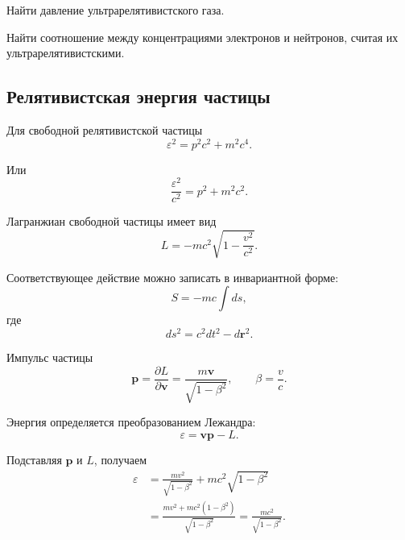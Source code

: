 \documentclass[../final.tex]{subfiles}
\begin{document}
Найти давление ультрарелятивистского газа.

Найти соотношение между концентрациями электронов и нейтронов,
считая их ультрарелятивистскими.



\subsection*{Релятивистская энергия частицы}

Для свободной релятивистской частицы
%
\begin{equation*}
    \varepsilon^2
    =
    p^2c^2
    +
    m^2c^4.
\end{equation*}

Или
%
\begin{equation*}
    \frac{\varepsilon^2}{c^2}
    =
    p^2
    +
    m^2c^2.
\end{equation*}

Лагранжиан свободной частицы имеет вид
%
\begin{equation*}
    L
    =
    -mc^2
    \sqrt{
        1-\frac{v^2}{c^2}
    }.
\end{equation*}

Соответствующее действие можно записать в инвариантной форме:
%
\begin{equation*}
    S
    =
    -mc
    \int ds,
\end{equation*}
%
где
%
\begin{equation*}
    ds^2
    =
    c^2dt^2
    -
    d\mathbf r^2.
\end{equation*}

Импульс частицы
%
\begin{equation*}
    \mathbf p
    =
    \frac{\partial L}{\partial\mathbf v}
    =
    \frac{m\mathbf v}
    {\sqrt{1-\beta^2}},
    \qquad
    \beta
    =
    \frac{v}{c}.
\end{equation*}

Энергия определяется преобразованием Лежандра:
%
\begin{equation*}
    \varepsilon
    =
    \mathbf v\mathbf p
    -
    L.
\end{equation*}

Подставляя $\mathbf p$ и $L$, получаем
%
\begin{align*}
    \varepsilon
    &=
    \frac{mv^2}{\sqrt{1-\beta^2}}
    +
    mc^2\sqrt{1-\beta^2}
    \\[3pt]
    &=
    \frac{
        mv^2+mc^2(1-\beta^2)
    }{
        \sqrt{1-\beta^2}
    }
    =
    \frac{mc^2}{\sqrt{1-\beta^2}}.
\end{align*}
\end{document}
